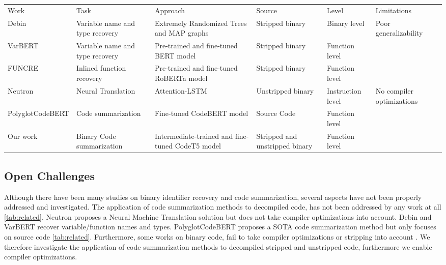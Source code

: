 \label{tab:related}
\begin{table}[!h]
\begin{sideways}
\begin{tabulary}{1.5\textwidth}{lLLLLL}
Work     & Task                            & Approach                                           & Source                         & Level             & Limitations               \\
Debin    & Variable name and type recovery & Extremely Randomized Trees and MAP graphs           & Stripped binary                & Binary level      & Poor generalizability     \\
VarBERT  & Variable name and type recovery & Pre-trained and fine-tuned BERT model              & Stripped binary                & Function level    &                           \\
FUNCRE   & Inlined function recovery       & Pre-trained and fine-tuned RoBERTa model           & Stripped binary                & Function level    &                           \\
Neutron  & Neural Translation              & Attention-LSTM                                     & Unstripped binary              & Instruction level & No compiler optimizations \\ 
PolyglotCodeBERT & Code summarization       & Fine-tuned CodeBERT model   & Source Code & Function level    &   \\
Our work & Binary Code summarization              & Intermediate-trained and fine-tuned CodeT5 model   & Stripped and unstripped binary & Function level    &   \\

\end{tabulary}
\end{sideways}
\end{table}

\subsection{Open Challenges}
Although there have been many studies on binary identifier recovery and code summarization, several aspects have not been properly addressed and investigated. The application of code summarization methods to decompiled code, has not been addressed by any work at all \ref{tab:related}. Neutron \cite{Neutron} proposes a Neural Machine Translation solution but does not take compiler optimizations into account. Debin \cite{Debin} and VarBERT recover variable/function names and types. PolyglotCodeBERT proposes a SOTA code summarization method but only focuses on source code \ref{tab:related}. Furthermore, some works on binary code, fail to take compiler optimizations or stripping into account \cite{Neutron}. We therefore investigate the application of code summarization methods to decompiled stripped and unstripped code, furthermore we enable compiler optimizations.
